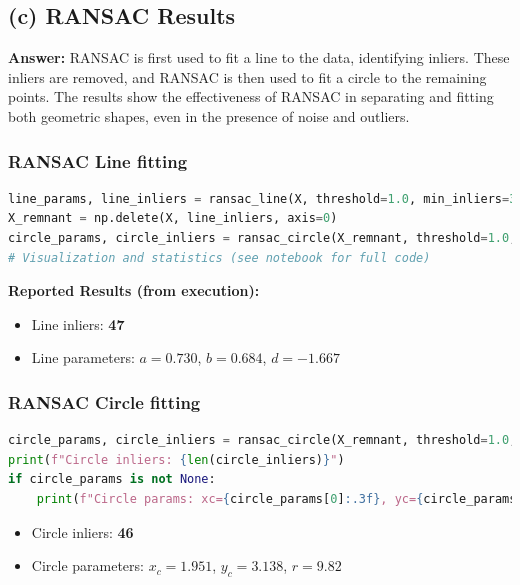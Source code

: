 \documentclass[10pt,a4paper,twocolumn]{article}
\begin{document}
\subsection*{(c) RANSAC Results}
\textbf{Answer:} RANSAC is first used to fit a line to the data, identifying inliers. These inliers are removed, 
and RANSAC is then used to fit a circle to the remaining points.
 The results show the effectiveness of RANSAC in separating and fitting both
  geometric shapes, even in the presence of noise and outliers.
\subsubsection{RANSAC Line fitting}
\begin{lstlisting}[language=Python, style=mystyle]
line_params, line_inliers = ransac_line(X, threshold=1.0, min_inliers=30, max_trials=500)
X_remnant = np.delete(X, line_inliers, axis=0)
circle_params, circle_inliers = ransac_circle(X_remnant, threshold=1.0, min_inliers=30, max_trials=500)
# Visualization and statistics (see notebook for full code)
\end{lstlisting}

\noindent\textbf{Reported Results (from execution):}
\begin{itemize}
    \item Line inliers: \textbf{47}
    \item Line parameters: $a=\mathbf{0.730}$, $b=\mathbf{0.684}$, $d=\mathbf{-1.667}$
\end{itemize}

\subsubsection{RANSAC Circle fitting}
\begin{lstlisting}[language=Python, style=mystyle]
circle_params, circle_inliers = ransac_circle(X_remnant, threshold=1.0, min_inliers=30, max_trials=500)
print(f"Circle inliers: {len(circle_inliers)}")
if circle_params is not None:
    print(f"Circle params: xc={circle_params[0]:.3f}, yc={circle_params[1]:.3f}, r={circle_params[2]:.3f}")
\end{lstlisting}

\begin{itemize}
    \item Circle inliers: \textbf{46}
    \item Circle parameters: $x_c=\mathbf{1.951}$, $y_c=\mathbf{3.138}$, $r=\mathbf{9.82}$
\end{itemize}
\end{document}
